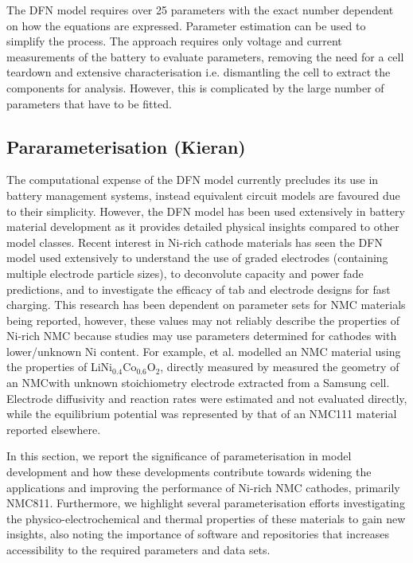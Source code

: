 \documentclass[journal=jacsat,manuscript=article]{achemso}
\begin{document}
The DFN model requires over 25 parameters with the exact number dependent on how the equations are expressed.\cite{Kim2011} Parameter estimation can be used to simplify the process. The approach requires only voltage and current measurements of the battery to evaluate parameters, removing the need for a cell teardown and extensive characterisation i.e. dismantling the cell to extract the components for analysis. \cite{Jin2018} However, this is complicated by the large number of parameters that have to be fitted.

\subsection{Pararameterisation (Kieran)}
The computational expense of the DFN model currently precludes its use in battery management systems, instead equivalent circuit models are favoured due to their simplicity.\cite{Marquis2019} However, the DFN model has been used extensively in battery material development as it provides detailed physical insights compared to other model classes.\cite{Dawson2018} Recent interest in Ni-rich cathode materials has seen the DFN model used extensively to understand the use of graded electrodes (containing multiple electrode particle sizes), to deconvolute capacity and power fade predictions, and to investigate the efficacy of tab and electrode designs for fast charging.\cite{Richardson2020,Kindermann2017,Sturm2019} This research has been dependent on parameter sets for NMC materials being reported, however, these values may not reliably describe the properties of Ni-rich NMC because studies may use parameters determined for cathodes with lower/unknown Ni content. For example, \citeauthor{Richardson2020} et al. modelled an NMC material using the properties of LiNi$_{0.4}$Co$_{0.6}$O$_2$, directly measured by \citeauthor{Ecker2015}\cite{Richardson2020,Ecker2015} \citeauthor{Kindermann2017} measured the geometry of an NMC\textendash with unknown stoichiometry  \textendash electrode extracted from a Samsung cell.\cite{Kindermann2017} Electrode diffusivity and reaction rates were estimated and not evaluated directly, while the equilibrium potential was represented by that of an NMC111 material reported elsewhere.\cite{Stewart_2008} 

In this section, we report the significance of parameterisation in model development and how these developments contribute towards widening the applications and improving the performance of Ni-rich NMC cathodes, primarily NMC811. Furthermore, we highlight several parameterisation efforts investigating the physico-electrochemical and thermal properties of these materials to gain new insights, also noting the importance of software and repositories that increases accessibility to the required parameters and data sets. 
\end{document}
